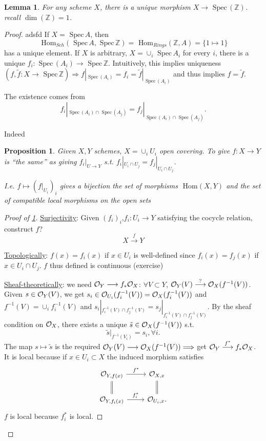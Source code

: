 \documentclass[11pt]{article}
\newtheorem{prop}[thm]{Proposition}
\newtheorem{lemma}[thm]{Lemma}
\renewcommand{\hom}{\text{ Hom}}
\newcommand{\spec}{\text{ Spec}\,}
\newcommand{\intg}{\mathbb Z}
\newcommand{\calo}{{\cal O}}
\newcommand{\Lrta}{\Longrightarrow}
\newcommand{\lrta}{\longrightarrow}
\begin{document}
\begin{lemma}
For any scheme $X$, there is a unique morphism $X\lrta \spec(\intg)$. recall $\dim(\intg)=1$.
\end{lemma}
\begin{proof} adsfd
If $X=\spec A$, then
$$
\hom_{Sch}(\spec A,\spec \intg)=\hom_{Rings}(\intg, A)=\{1\mapsto 1\}
$$
has a unique element. If $X$ is arbitrary, $X=\cup_{i}\spec A_i$ for every $i$, there is a unique $f_i:\spec (A_i)\lrta \spec \intg$. Intuitively, this implies uniqueness $(f,\tilde{f}:X\lrta \spec \intg)\Lrta f|_{\spec(A_i)}=f_i=\tilde{f}|_{\spec(A_i)}$ and thus implies $f=\tilde{f}$. 

The existence comes from
$$
f_i|_{\spec(A_i)\cap \spec(A_j)}=f_j|_{\spec(A_i)\cap \spec(A_j)}.
$$

Indeed
\begin{prop}\label{prop:morphism_of_scheme_determined_by_open_cover}
Given $X,Y$ schemes, $X=\cup_i U_i$ open covering. To give $f:X\lrta Y$ is ``the same'' as giving $f_i|_{U\lrta Y}$ s.t. $f_i|_{U_i\cap U_j}=f_j|_{U_i\cap U_j}$.

 I.e. 
$f\mapsto (f|_{U_i})_i$ gives a bijection the set of morphisms $\hom(X,Y)$ and the set of compatible local morphisms on the open sets
\end{prop}
\begin{proof}[Proof of \ref{prop:morphism_of_scheme_determined_by_open_cover}]
\underline{Surjectivity}: Given $(f_i)_i$,$ f_i:U_i\lrta Y$ satisfying the cocycle relation, construct $f$? 
$$
X\overset{f}{\lrta } Y
$$

\underline{Topologically}: $f(x)=f_i(x)$ if $x\in U_i$ is well-defined since $f_i(x)=f_j(x)$ if $x\in U_i\cap U_j$. $f$ thus defined is continuous (exercise)

\underline{Sheaf-theoretically}: we need $\calo_Y\lrta f_*\calo_X$: $\forall V\subset Y$, $\calo_Y(V)\overset{?}{\lrta}\calo_X(f^{-1}(V))$. Given $s\in \calo_Y(V)$, we get $s_i\in \calo_{U_i}(f_i^{-1}(V))=\calo_X(f_i^{-1}(V))$ and $f^{-1}(V)=\cup_i f_i^{-1}(V)$ and 
$s_i|_{f_i^{-1}(V)\cap f_j^{-1}(V)}=s_j|_{f_i^{-1}(V)\cap f_j^{-1}(V)}$. By the sheaf condition on $\calo_X$, there exists a unique $\tilde{s}\in \calo_X(f^{-1}(V))$ s.t.
$$
\tilde{s}|_{f^{-1}(V_i)}=s_i,\forall i.
$$
The map $s\mapsto \tilde{s}$ is the required
$\calo_Y(V)\lrta \calo_X(f^{-1}(V))\Lrta $ get $\calo_Y\overset{f^*}{\lrta }f_*\calo_X$. It is local because if $x\in U_i\subset X$ the induced morphism satisfies
$$
\begin{tikzcd}
{\calo_{Y,f(x)}} \arrow[r, "f^*"] \arrow[d, equal] & {\calo_{X,x}} \arrow[d, equal] \\
{\calo_{Y,f_i(x)}} \arrow[r, "f_i^*"] & {\calo_{U_i,x}}.
\end{tikzcd}
$$
$f$ is local because $f_i^*$ is local.
\end{proof}
\end{proof}
\end{document}

